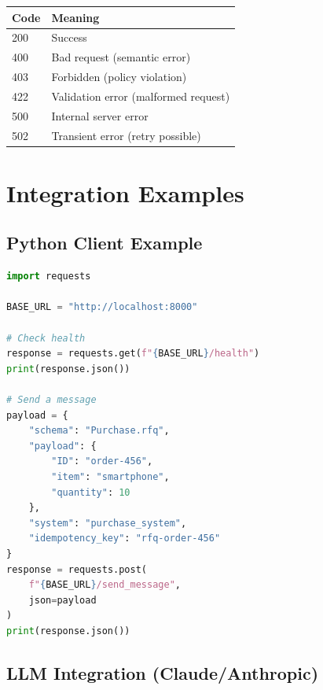 \documentclass[11pt,a4paper]{article}
\begin{document}
\begin{center}
\begin{tabular}{ll}
\toprule
\textbf{Code} & \textbf{Meaning} \\
\midrule
200 & Success \\
400 & Bad request (semantic error) \\
403 & Forbidden (policy violation) \\
422 & Validation error (malformed request) \\
500 & Internal server error \\
502 & Transient error (retry possible) \\
\bottomrule
\end{tabular}
\end{center}

\section{Integration Examples}

\subsection{Python Client Example}

\begin{lstlisting}[language=Python]
import requests

BASE_URL = "http://localhost:8000"

# Check health
response = requests.get(f"{BASE_URL}/health")
print(response.json())

# Send a message
payload = {
    "schema": "Purchase.rfq",
    "payload": {
        "ID": "order-456",
        "item": "smartphone",
        "quantity": 10
    },
    "system": "purchase_system",
    "idempotency_key": "rfq-order-456"
}
response = requests.post(
    f"{BASE_URL}/send_message",
    json=payload
)
print(response.json())
\end{lstlisting}

\subsection{LLM Integration (Claude/Anthropic)}
\end{document}
